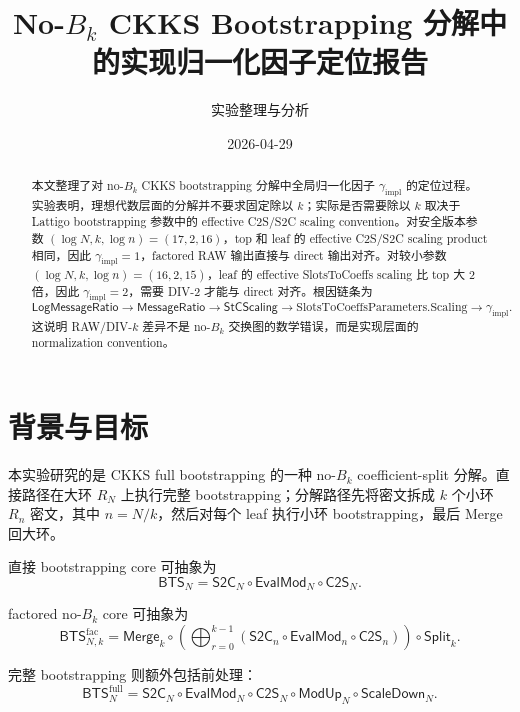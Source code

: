 \documentclass[UTF8,a4paper,11pt]{ctexart}
\title{No-$B_k$ CKKS Bootstrapping 分解中的实现归一化因子定位报告}
\author{实验整理与分析}
\date{2026-04-29}
\newcommand{\CtwoS}{\mathsf{C2S}}
\newcommand{\StwoC}{\mathsf{S2C}}
\newcommand{\EvalMod}{\mathsf{EvalMod}}
\newcommand{\Split}{\mathsf{Split}}
\newcommand{\Merge}{\mathsf{Merge}}
\newcommand{\BTS}{\mathsf{BTS}}
\newcommand{\ScaleDown}{\mathsf{ScaleDown}}
\newcommand{\ModUp}{\mathsf{ModUp}}
\newcommand{\LogMessageRatio}{\mathsf{LogMessageRatio}}
\newcommand{\MessageRatio}{\mathsf{MessageRatio}}
\newcommand{\StCScaling}{\mathsf{StCScaling}}
\begin{document}
\maketitle

\begin{abstract}
本文整理了对 no-$B_k$ CKKS bootstrapping 分解中全局归一化因子 $\gamma_{\mathrm{impl}}$ 的定位过程。实验表明，理想代数层面的分解并不要求固定除以 $k$；实际是否需要除以 $k$ 取决于 Lattigo bootstrapping 参数中的 effective C2S/S2C scaling convention。对安全版本参数 $(\log N,k,\log n)=(17,2,16)$，top 和 leaf 的 effective C2S/S2C scaling product 相同，因此 $\gamma_{\mathrm{impl}}=1$，factored RAW 输出直接与 direct 输出对齐。对较小参数 $(\log N,k,\log n)=(16,2,15)$，leaf 的 effective SlotsToCoeffs scaling 比 top 大 $2$ 倍，因此 $\gamma_{\mathrm{impl}}=2$，需要 DIV-2 才能与 direct 对齐。根因链条为
\[
\LogMessageRatio
\longrightarrow
\MessageRatio
\longrightarrow
\StCScaling
\longrightarrow
\mathrm{SlotsToCoeffsParameters.Scaling}
\longrightarrow
\gamma_{\mathrm{impl}}.
\]
这说明 RAW/DIV-$k$ 差异不是 no-$B_k$ 交换图的数学错误，而是实现层面的 normalization convention。
\end{abstract}

\tableofcontents
\newpage

\section{背景与目标}

本实验研究的是 CKKS full bootstrapping 的一种 no-$B_k$ coefficient-split 分解。直接路径在大环 $R_N$ 上执行完整 bootstrapping；分解路径先将密文拆成 $k$ 个小环 $R_n$ 密文，其中 $n=N/k$，然后对每个 leaf 执行小环 bootstrapping，最后 Merge 回大环。

直接 bootstrapping core 可抽象为
\begin{equation}
\BTS_N
=
\StwoC_N\circ\EvalMod_N\circ\CtwoS_N.
\end{equation}

factored no-$B_k$ core 可抽象为
\begin{equation}
\BTS_{N,k}^{\mathrm{fac}}
=
\Merge_k\circ
\left(\bigoplus_{r=0}^{k-1}
\left(\StwoC_n\circ\EvalMod_n\circ\CtwoS_n\right)
\right)
\circ\Split_k.
\end{equation}

完整 bootstrapping 则额外包括前处理：
\begin{equation}
\BTS_N^{\mathrm{full}}
=
\StwoC_N\circ\EvalMod_N\circ\CtwoS_N\circ\ModUp_N\circ\ScaleDown_N.
\end{equation}
\end{document}
